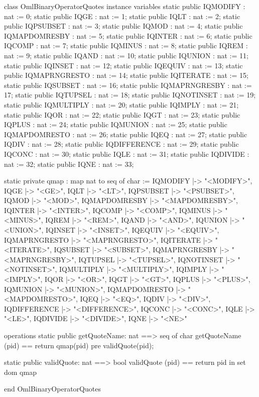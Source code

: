 \begin{vdm_al}
class OmlBinaryOperatorQuotes
instance variables
  static public IQMODIFY : nat := 0;
  static public IQGE : nat := 1;
  static public IQLT : nat := 2;
  static public IQPSUBSET : nat := 3;
  static public IQMOD : nat := 4;
  static public IQMAPDOMRESBY : nat := 5;
  static public IQINTER : nat := 6;
  static public IQCOMP : nat := 7;
  static public IQMINUS : nat := 8;
  static public IQREM : nat := 9;
  static public IQAND : nat := 10;
  static public IQUNION : nat := 11;
  static public IQINSET : nat := 12;
  static public IQEQUIV : nat := 13;
  static public IQMAPRNGRESTO : nat := 14;
  static public IQITERATE : nat := 15;
  static public IQSUBSET : nat := 16;
  static public IQMAPRNGRESBY : nat := 17;
  static public IQTUPSEL : nat := 18;
  static public IQNOTINSET : nat := 19;
  static public IQMULTIPLY : nat := 20;
  static public IQIMPLY : nat := 21;
  static public IQOR : nat := 22;
  static public IQGT : nat := 23;
  static public IQPLUS : nat := 24;
  static public IQMUNION : nat := 25;
  static public IQMAPDOMRESTO : nat := 26;
  static public IQEQ : nat := 27;
  static public IQDIV : nat := 28;
  static public IQDIFFERENCE : nat := 29;
  static public IQCONC : nat := 30;
  static public IQLE : nat := 31;
  static public IQDIVIDE : nat := 32;
  static public IQNE : nat := 33;

  static private qmap : map nat to seq of char :=
    { IQMODIFY |-> "<MODIFY>",
      IQGE |-> "<GE>",
      IQLT |-> "<LT>",
      IQPSUBSET |-> "<PSUBSET>",
      IQMOD |-> "<MOD>",
      IQMAPDOMRESBY |-> "<MAPDOMRESBY>",
      IQINTER |-> "<INTER>",
      IQCOMP |-> "<COMP>",
      IQMINUS |-> "<MINUS>",
      IQREM |-> "<REM>",
      IQAND |-> "<AND>",
      IQUNION |-> "<UNION>",
      IQINSET |-> "<INSET>",
      IQEQUIV |-> "<EQUIV>",
      IQMAPRNGRESTO |-> "<MAPRNGRESTO>",
      IQITERATE |-> "<ITERATE>",
      IQSUBSET |-> "<SUBSET>",
      IQMAPRNGRESBY |-> "<MAPRNGRESBY>",
      IQTUPSEL |-> "<TUPSEL>",
      IQNOTINSET |-> "<NOTINSET>",
      IQMULTIPLY |-> "<MULTIPLY>",
      IQIMPLY |-> "<IMPLY>",
      IQOR |-> "<OR>",
      IQGT |-> "<GT>",
      IQPLUS |-> "<PLUS>",
      IQMUNION |-> "<MUNION>",
      IQMAPDOMRESTO |-> "<MAPDOMRESTO>",
      IQEQ |-> "<EQ>",
      IQDIV |-> "<DIV>",
      IQDIFFERENCE |-> "<DIFFERENCE>",
      IQCONC |-> "<CONC>",
      IQLE |-> "<LE>",
      IQDIVIDE |-> "<DIVIDE>",
      IQNE |-> "<NE>" }

operations
  static public getQuoteName: nat ==> seq of char
  getQuoteName (pid) ==
    return qmap(pid)
    pre validQuote(pid);

  static public validQuote: nat ==> bool
  validQuote (pid) == return pid in set dom qmap

end OmlBinaryOperatorQuotes
\end{vdm_al}
